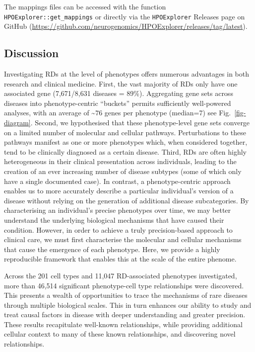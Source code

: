\documentclass[
]{article}
\begin{document}
The mappings files can be accessed with the function
\texttt{HPOExplorer::get\_mappings} or directly via the
\texttt{HPOExplorer} Releases page on GitHub
(\url{https://github.com/neurogenomics/HPOExplorer/releases/tag/latest}).

\subsection{Discussion}\label{sec-discussion}

Investigating RDs at the level of phenotypes offers numerous advantages
in both research and clinical medicine. First, the vast majority of RDs
only have one associated gene (7,671/8,631 diseases = 89\%). Aggregating
gene sets across diseases into phenotype-centric ``buckets'' permits
sufficiently well-powered analyses, with an average of
\textasciitilde{}\(76\) genes per phenotype (median=7) see
Fig.~\ref{fig-diagram}. Second, we hypothesised that these
phenotype-level gene sets converge on a limited number of molecular and
cellular pathways. Perturbations to these pathways manifest as one or
more phenotypes which, when considered together, tend to be clinically
diagnosed as a certain disease. Third, RDs are often highly
heterogeneous in their clinical presentation across individuals, leading
to the creation of an ever increasing number of disease subtypes (some
of which only have a single documented case). In contrast, a
phenotype-centric approach enables us to more accurately describe a
particular individual's version of a disease without relying on the
generation of additional disease subcategories. By characterising an
individual's precise phenotypes over time, we may better understand the
underlying biological mechanisms that have caused their condition.
However, in order to achieve a truly precision-based approach to
clinical care, we must first characterise the molecular and cellular
mechanisms that cause the emergence of each phenotype. Here, we provide
a highly reproducible framework that enables this at the scale of the
entire phenome.

Across the 201 cell types and 11,047 RD-associated phenotypes
investigated, more than 46,514 significant phenotype-cell type
relationships were discovered. This presents a wealth of opportunities
to trace the mechanisms of rare diseases through multiple biological
scales. This in turn enhances our ability to study and treat causal
factors in disease with deeper understanding and greater precision.
These results recapitulate well-known relationships, while providing
additional cellular context to many of these known relationships, and
discovering novel relationships.
\end{document}
